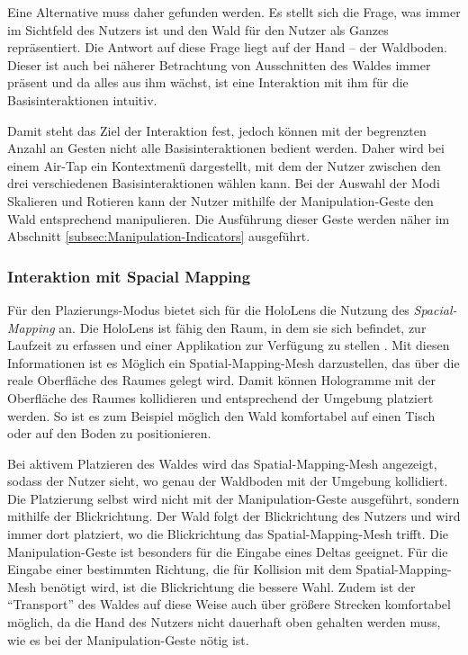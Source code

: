 Eine Alternative muss daher gefunden werden. Es stellt sich die Frage, was immer im Sichtfeld des Nutzers ist und den Wald für den Nutzer als Ganzes repräsentiert. Die Antwort auf diese Frage liegt auf der Hand -- der Waldboden. Dieser ist auch bei näherer Betrachtung von Ausschnitten des Waldes immer präsent und da alles aus ihm wächst, ist eine Interaktion mit ihm für die Basisinteraktionen intuitiv.

Damit steht das Ziel der Interaktion fest, jedoch können mit der begrenzten Anzahl an Gesten nicht alle Basisinteraktionen bedient werden. Daher wird bei einem Air-Tap ein Kontextmenü dargestellt, mit dem der Nutzer zwischen den drei verschiedenen Basisinteraktionen wählen kann. Bei der Auswahl der Modi Skalieren und Rotieren kann der Nutzer mithilfe der Manipulation-Geste den Wald entsprechend manipulieren. Die Ausführung dieser Geste werden näher im Abschnitt \ref{subsec:Manipulation-Indicators} ausgeführt.

\subsubsection*{Interaktion mit Spacial Mapping}
Für den Plazierungs-Modus bietet sich für die HoloLens die Nutzung des \textit{Spacial-Mapping} an. Die HoloLens ist fähig den Raum, in dem sie sich befindet, zur Laufzeit zu erfassen und einer Applikation zur Verfügung zu stellen \cite{windows2017spacial}. Mit diesen Informationen ist es Möglich ein Spatial-Mapping-Mesh darzustellen, das über die reale Oberfläche des Raumes gelegt wird. Damit können Hologramme mit der Oberfläche des Raumes kollidieren und entsprechend der Umgebung platziert werden. So ist es zum Beispiel möglich den Wald komfortabel auf einen Tisch oder auf den Boden zu positionieren.

Bei aktivem Platzieren des Waldes wird das Spatial-Mapping-Mesh angezeigt, sodass der Nutzer sieht, wo genau der Waldboden mit der Umgebung kollidiert. Die Platzierung selbst wird nicht mit der Manipulation-Geste ausgeführt, sondern mithilfe der Blickrichtung. Der Wald folgt der Blickrichtung des Nutzers und wird immer dort platziert, wo die Blickrichtung das Spatial-Mapping-Mesh trifft. Die Manipulation-Geste ist besonders für die Eingabe eines Deltas geeignet. Für die Eingabe einer bestimmten Richtung, die für Kollision mit dem Spatial-Mapping-Mesh benötigt wird, ist die Blickrichtung die bessere Wahl. Zudem ist der "`Transport"' des Waldes auf diese Weise auch über größere Strecken komfortabel möglich, da die Hand des Nutzers nicht dauerhaft oben gehalten werden muss, wie es bei der Manipulation-Geste nötig ist. 

